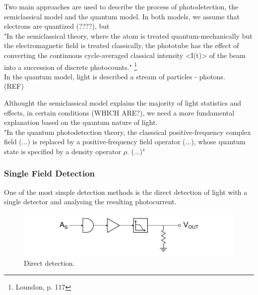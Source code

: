 \begin{bibunit}[plain]
Two main approaches are used to describe the process of photodetection, the semiclassical model and the quantum model. In both models, we assume that electrons are quantized (????), but 
\\

"In the semiclassical theory, where the atom is treated quantum-mechanically but the electromagnetic field is treated classically, the phototube has the effect of converting the continuous cycle-averaged classical intensity <I(t)> of the beam into a succession of discrete photocounts."
\footnote{Loundon, p. 117}\\



In the quantum model, light is described a stream of particles - photons.\\
(REF)

Althought the semiclassical model explains the majority of light statistics and effects, in certain conditions (WHICH ARE?), we need a more fundamental explanation based on  the quantum nature of light.\\

"In the quantum photodetection theory, the classsical positive-frequency complex field (...) is replaced by a positive-frequency field operator (...), whose quantum state is specified by a density operator $\rho$. (...)"\\
\cite{shapiro1985quantum} %






\subsubsection{Single Field Detection}

One of the most simple detection methods is the direct detection of light with a single detector and analysing the resulting photocurrent.
\cite{hans2004} %
%
\begin{figure}[H]
	\label{fig:detection_direct}
	\centering
	\includegraphics{./sdf/optical_detection/figures/detection-direct.pdf}
	\caption{Direct detection.}
\end{figure}



\end{bibunit}
